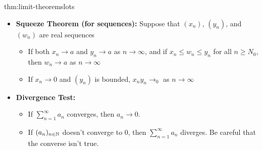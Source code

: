 \documentclass[landscape, 8pt]{extarticle}
\begin{document}
\begin{multicols}{3}

\begin{thm}{thm:limit-theorems}{lots}
\renewcommand\labelitemi{\tiny$\bullet$}
\begin{itemize}
    \setlength\itemsep{0em}
    \vspace{-2pt}
    \item \textbf{Squeeze Theorem (for sequences):} Suppose that $(x_{n})$, $(y_{n})$, and $(w_{n})$ are real sequences
    \vspace{-5pt}
    \renewcommand\labelitemi{\tiny$\bullet$}
    \begin{itemize}
        \setlength\itemsep{0em}
        \item If both $x_{n}\to a$ and $y_{n} \to a$ as $n\to\infty$, and if $x_{n}\le w_{n}\le y_{n}$ for all $n\ge N_{0}$, then $w_{n}\to a$ as $n\to\infty$
        \item If $x_{n}\to 0$ and $(y_{n})$ is bounded, $x_{n}y_{n}\to_{0}$ as $n\to\infty$
    \end{itemize}
    \vspace{-5pt}
    
    \item \textbf{Divergence Test:}
    \vspace{-5pt}
    \renewcommand\labelitemi{\tiny$\bullet$}
    \begin{itemize}
        \setlength\itemsep{0em}
        \item If $\sum^{\infty}_{n=1} a_n$ converges, then $a_n\to0$.
        \item If $(a_n)_{n\in\mathbb{N}}$ doesn't converge to $0$, then $\sum_{n=1}^{\infty} a_n$ diverges. Be careful that the converse isn't true.
    \end{itemize}
    \vspace{-5pt}
    
    

\end{itemize}
\end{thm}
\end{multicols}
\end{document}
